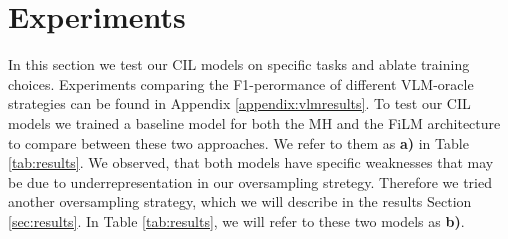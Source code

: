 \chapter{Experiments}
\label{chapter:experiments}

In this section we test our CIL models on specific tasks and ablate training choices. Experiments comparing the F1-perormance of different VLM-oracle strategies can be found in Appendix \ref{appendix:vlmresults}. 
To test our CIL models we trained a baseline model for both the MH and the FiLM architecture to compare between these two approaches. 
We refer to them as \textbf{a)} in Table \ref{tab:results}. 
We observed, that both models have specific weaknesses that may be due to underrepresentation in our oversampling stretegy. 
Therefore we tried another oversampling strategy, which we will describe in the results Section \ref{sec:results}. 
In Table \ref{tab:results}, we will refer to these two models as \textbf{b)}. 

